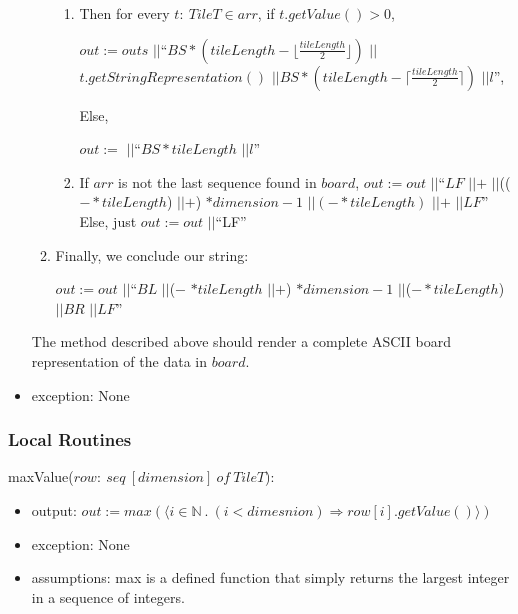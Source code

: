 \documentclass[12pt]{article}
\newcommand{\concat}{$\vert\vert$}
\begin{document}
\begin{itemize}
\begin{enumerate}
\begin{enumerate}
                  \item Then for every $t:\ TileT \in arr$, if $t.getValue() > 0$,

                        $out := outs$ \concat ``$BS * (tileLength - \lfloor\frac{tileLength}{2}\rfloor)$ \concat $t.getStringRepresentation()$ \concat $BS * (tileLength - \lceil\frac{tileLength}{2}\rceil)$ \concat $l$'',

                        Else,

                        $out :=$ \concat ``$BS * tileLength$ \concat $l$''

                  \item If $arr$ is not the last sequence found in $board$,
                        $out := out$ \concat ``$LF$ \concat $+$ \concat (($- * tileLength$) \concat $+$) $* dimension - 1$ \concat $(- * tileLength)$ \concat $+$ \concat $LF$''
                        Else, just $out := out$ \concat ``LF''
                \end{enumerate}

          \item Finally, we conclude our string:

                $out := out$ \concat ``$BL$ \concat ($-$ $* tileLength$ \concat $+$) $* dimension - 1$ \concat ($- * tileLength$) \concat $BR$ \concat $LF$''
        \end{enumerate}

        The method described above should render a complete ASCII board representation of the data in $board$.

  \item exception: None
\end{itemize}

\subsubsection* {Local Routines}

\noindent maxValue($row:\ seq\ [dimension]\ of\ TileT$):
\begin{itemize}
  \item output: $out := max(\langle i \in \mathbb{N}\ .\ (i < dimesnion) \Rightarrow row[i].getValue() \rangle)$
  \item exception: None
  \item assumptions: max is a defined function that simply returns the largest integer in a sequence of integers.
\end{itemize}
\end{document}

